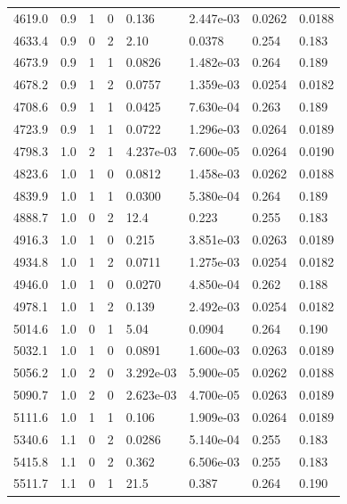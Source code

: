 \documentclass[preview]{standalone}
\begin{document}
{{{\begin{tabular}{L{1.2cm}C{1.2cm} C{0.3cm}C{0.5cm} C{1.4cm}C{1.4cm} C{1.4cm}C{1.4cm}}
  4619.0  &   0.9  & 1     &  0 &  0.136  & 2.447e-03  & 0.0262 &  0.0188   \\ 
  4633.4  &   0.9  & 0     &  2 &  2.10  & 0.0378  & 0.254 &  0.183   \\ 
  4673.9  &   0.9  & 1     &  1 &  0.0826  & 1.482e-03  & 0.264 &  0.189   \\ 
  4678.2  &   0.9  & 1     &  2 &  0.0757  & 1.359e-03  & 0.0254 &  0.0182   \\ 
  4708.6  &   0.9  & 1     &  1 &  0.0425  & 7.630e-04  & 0.263 &  0.189   \\ 
  4723.9  &   0.9  & 1     &  1 &  0.0722  & 1.296e-03  & 0.0264 &  0.0189   \\ 
  4798.3  &   1.0  & 2     &  1 &  4.237e-03  & 7.600e-05  & 0.0264 &  0.0190   \\ 
  4823.6  &   1.0  & 1     &  0 &  0.0812  & 1.458e-03  & 0.0262 &  0.0188   \\ 
  4839.9  &   1.0  & 1     &  1 &  0.0300  & 5.380e-04  & 0.264 &  0.189   \\ 
  4888.7  &   1.0  & 0     &  2 &  12.4  & 0.223  & 0.255 &  0.183   \\ 
  4916.3  &   1.0  & 1     &  0 &  0.215  & 3.851e-03  & 0.0263 &  0.0189   \\ 
  4934.8  &   1.0  & 1     &  2 &  0.0711  & 1.275e-03  & 0.0254 &  0.0182   \\ 
  4946.0  &   1.0  & 1     &  0 &  0.0270  & 4.850e-04  & 0.262 &  0.188   \\ 
  4978.1  &   1.0  & 1     &  2 &  0.139  & 2.492e-03  & 0.0254 &  0.0182   \\ 
  5014.6  &   1.0  & 0     &  1 &  5.04  & 0.0904  & 0.264 &  0.190   \\ 
  5032.1  &   1.0  & 1     &  0 &  0.0891  & 1.600e-03  & 0.0263 &  0.0189   \\ 
  5056.2  &   1.0  & 2     &  0 &  3.292e-03  & 5.900e-05  & 0.0262 &  0.0188   \\ 
  5090.7  &   1.0  & 2     &  0 &  2.623e-03  & 4.700e-05  & 0.0263 &  0.0189   \\ 
  5111.6  &   1.0  & 1     &  1 &  0.106  & 1.909e-03  & 0.0264 &  0.0189   \\ 
  5340.6  &   1.1  & 0     &  2 &  0.0286  & 5.140e-04  & 0.255 &  0.183   \\ 
  5415.8  &   1.1  & 0     &  2 &  0.362  & 6.506e-03  & 0.255 &  0.183   \\ 
  5511.7  &   1.1  & 0     &  1 &  21.5  & 0.387  & 0.264 &  0.190   \\ 

\end{tabular}}}}
\end{document}
